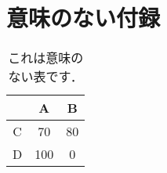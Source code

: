 \documentclass[dvipdfmx]{ampbt}
\begin{document}




\appendix

\section{意味のない付録}

\begin{table}[htbp]
  \caption{これは意味のない表です．}
  \centering
  \begin{tabular}{c|cc}
      &  A  &  B \\
    \hline
    C &  70 & 80 \\
    D & 100 &  0
  \end{tabular}
\end{table}

\fi
\ifoutputcover
\evenclearpage
\makecover                      %
\makespine[1]                   %
\makeinsidecover                %
\fi
\ifoutputabstractforsubmission
\makeabstractforsubmission      %
\fi
\end{document}
